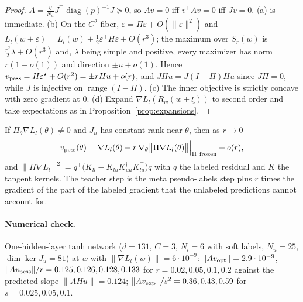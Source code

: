 \begin{proof}
$A=\frac{\eta}{N_u}J^\top\operatorname{diag}(p)^{-1}J\succeq0$, so $Av=0$ iff $v^\top Av=0$ iff $Jv=0$.
(a) is immediate. (b) On the $C^2$ fiber, $\varepsilon=\Pi\varepsilon+O(\|\varepsilon\|^2)$ and
$L_l(w+\varepsilon)=L_l(w)+\frac12\varepsilon^\top H\varepsilon+O(r^3)$; the maximum over $S_r(w)$
is $\frac{r^2}{2}\lambda+O(r^3)$ and, $\lambda$ being simple and positive, every maximizer has
norm $r(1-o(1))$ and direction $\pm u+o(1)$. Hence $v_{\rm pess}=H\varepsilon^\star+O(r^2)=\pm rHu+o(r)$,
and $JHu=J(I-\Pi)Hu$ since $J\Pi=0$, while $J$ is injective on
$\operatorname{range}(I-\Pi)$. (c) The inner objective is strictly concave with zero gradient
at $0$. (d) Expand $\nabla L_l(R_w(w+\xi))$ to second order and take expectations as in
Proposition~\ref{prop:expansions}.
\end{proof}

\begin{proposition}\label{prop:firstorder}
If $\Pi_\theta\nabla L_l(\theta)\neq0$ and $J_u$ has constant rank near $\theta$, then as $r\to0$
\[
v_{\rm pess}(\theta)=\nabla L_l(\theta)+r\,\nabla_\theta\big\|\Pi\nabla L_l(\theta)\big\|\Big|_{\Pi\ \text{frozen}}+o(r),
\]
and $\|\Pi\nabla L_l\|^2=q^\top\big(K_{ll}-K_{lu}K_{uu}^\dagger K_{lu}^\top\big)q$ with $q$ the labeled
residual and $K$ the tangent kernels. The teacher step is the meta pseudo-labels step
plus $r$ times the gradient of the part of the labeled gradient that the unlabeled
predictions cannot account for.
\end{proposition}

\paragraph{Numerical check.} One-hidden-layer tanh network ($d=131$, $C=3$, $N_l=6$ with
soft labels, $N_u=25$, $\dim\ker J_u=81$) at $w$ with $\|\nabla L_l(w)\|=6\cdot10^{-9}$:
$\|Av_{\rm opt}\|=2.9\cdot10^{-9}$, $\|Av_{\rm pess}\|/r=0.125,0.126,0.128,0.133$ for
$r=0.02,0.05,0.1,0.2$ against the predicted slope $\|AHu\|=0.124$;
$\|Av_{\rm exp}\|/s^2=0.36,0.43,0.59$ for $s=0.025,0.05,0.1$.

